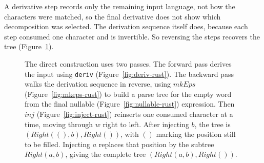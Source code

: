 A derivative step records only the remaining input language, 
not how the characters were matched, 
so the final derivative does not show which decomposition was selected. 
The derivation sequence itself does, 
because each step consumed one character and is invertible.
So reversing the steps recovers the tree (Figure~\ref{fig:two-pass}).
\begin{figure}[ht]
\centering
{}
\caption{The direct construction uses two passes. 
The forward pass derives the input using \texttt{deriv} (Figure~\ref{fig:deriv-rust}).
The backward pass walks the derivation sequence in reverse, using
$\mathit{mkEps}$ (Figure~\ref{fig:mkeps-rust}) to build a parse tree for the empty word 
from the final nullable (Figure~\ref{fig:nullable-rust}) expression.
Then $\mathit{inj}$ (Figure~\ref{fig:inject-rust}) 
reinserts one consumed character at a time, 
moving through $w$ right to left.
After injecting $b$, the tree is $(\mathit{Right}((),b),\mathit{Right}())$, 
with $()$ marking the position still to be filled. 
Injecting $a$ replaces that position by the subtree $\mathit{Right}(a,b)$, 
giving the complete tree $(\mathit{Right}(a,b),\mathit{Right}())$.
}
\label{fig:two-pass}
\end{figure}

